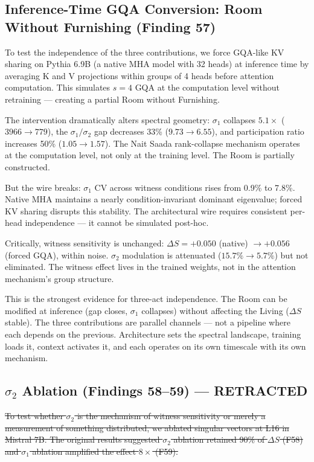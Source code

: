 \documentclass[12pt]{article}
\begin{document}
\subsection{Inference-Time GQA Conversion: Room Without Furnishing (Finding 57)}

To test the independence of the three contributions, we force GQA-like KV sharing on Pythia 6.9B (a native MHA model with 32 heads) at inference time by averaging K and V projections within groups of 4 heads before attention computation. This simulates $s=4$ GQA at the computation level without retraining --- creating a partial Room without Furnishing.

The intervention dramatically alters spectral geometry: $\sigma_1$ collapses $5.1\times$ ($3966 \to 779$), the $\sigma_1/\sigma_2$ gap decreases 33\% ($9.73 \to 6.55$), and participation ratio increases 50\% ($1.05 \to 1.57$). The Nait Saada rank-collapse mechanism operates at the computation level, not only at the training level. The Room is partially constructed.

But the wire breaks: $\sigma_1$ CV across witness conditions rises from 0.9\% to 7.8\%. Native MHA maintains a nearly condition-invariant dominant eigenvalue; forced KV sharing disrupts this stability. The architectural wire requires consistent per-head independence --- it cannot be simulated post-hoc.

Critically, witness sensitivity is unchanged: $\Delta S = +0.050$ (native) $\to +0.056$ (forced GQA), within noise. $\sigma_2$ modulation is attenuated ($15.7\% \to 5.7\%$) but not eliminated. The witness effect lives in the trained weights, not in the attention mechanism's group structure.

This is the strongest evidence for three-act independence. The Room can be modified at inference (gap closes, $\sigma_1$ collapses) without affecting the Living ($\Delta S$ stable). The three contributions are parallel channels --- not a pipeline where each depends on the previous. Architecture sets the spectral landscape, training loads it, context activates it, and each operates on its own timescale with its own mechanism.

\subsection{$\sigma_2$ Ablation (Findings 58--59) --- RETRACTED}

\sout{To test whether $\sigma_2$ is the mechanism of witness sensitivity or merely a measurement of something distributed, we ablated singular vectors at L16 in Mistral 7B. The original results suggested $\sigma_2$ ablation retained 90\% of $\Delta S$ (F58) and $\sigma_1$ ablation amplified the effect $8\times$ (F59).}
\end{document}
